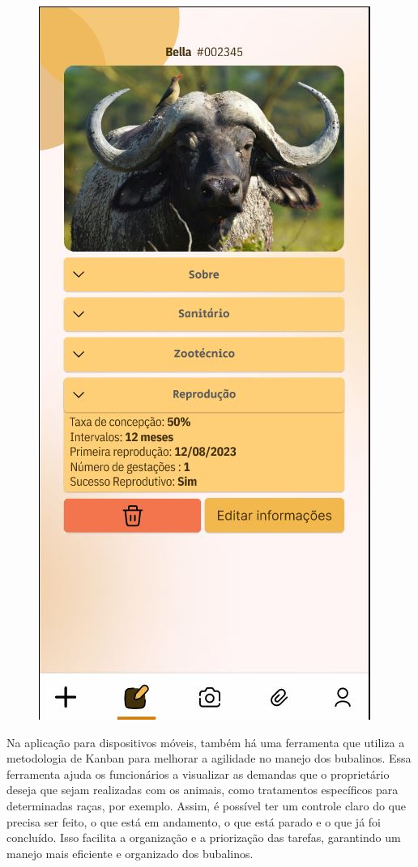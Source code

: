 \begin{figure}[!h]
\includegraphics[scale=0.4]{Illustrations/UX-Mobile/Mobi-03.04.JPG}
\end{figure}

Na aplicação para dispositivos móveis, também há uma ferramenta que utiliza a metodologia de Kanban  para melhorar a agilidade no manejo dos bubalinos. Essa ferramenta ajuda os funcionários a visualizar as demandas que o proprietário deseja que sejam realizadas com os animais, como tratamentos específicos para determinadas raças, por exemplo. Assim, é possível ter um controle claro do que precisa ser feito, o que está em andamento, o que está parado e o que já foi concluído. Isso facilita a organização e a priorização das tarefas, garantindo um manejo mais eficiente e organizado dos bubalinos.

